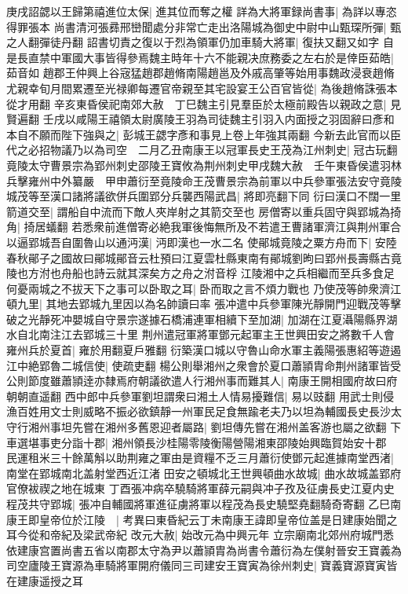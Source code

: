 庚戌詔勰以王歸第禧進位太保|{
	進其位而奪之權}
詳為大將軍録尚書事|{
	為詳以專恣得罪張本}
尚書清河張彞邢巒聞處分非常亡走出洛陽城為御史中尉中山甄琛所彈|{
	甄之人翻彈徒丹翻}
詔書切責之復以于烈為領軍仍加車騎大將軍|{
	復扶又翻又如字}
自是長直禁中軍國大事皆得參焉魏主時年十六不能親决庶務委之左右於是倖臣茹皓|{
	茹音如}
趙郡王仲興上谷宼猛趙郡趙脩南陽趙邕及外戚高肇等始用事魏政浸衰趙脩尤親幸旬月間累遷至光禄卿每遷官帝親至其宅設宴王公百官皆從|{
	為後趙脩誅張本從才用翻}
辛亥東昏侯祀南郊大赦　丁巳魏主引見羣臣於太極前殿告以親政之意|{
	見賢遍翻}
壬戌以咸陽王禧領太尉廣陵王羽為司徒魏主引羽入内面授之羽固辭曰彥和本自不願而陛下強與之|{
	彭城王勰字彥和事見上卷上年強其兩翻}
今新去此官而以臣代之必招物議乃以為司空　二月乙丑南康王以冠軍長史王茂為江州刺史|{
	冠古玩翻}
竟陵太守曹景宗為郢州刺史邵陵王寶攸為荆州刺史甲戌魏大赦　壬午東昏侯遣羽林兵擊雍州中外纂嚴　甲申蕭衍至竟陵命王茂曹景宗為前軍以中兵參軍張法安守竟陵城茂等至漢口諸將議欲併兵圍郢分兵襲西陽武昌|{
	將即亮翻下同}
衍曰漢口不闊一里箭道交至|{
	謂船自中流而下敵人夾岸射之其箭交至也}
房僧寄以重兵固守與郢城為掎角|{
	掎居蟻翻}
若悉衆前進僧寄必絶我軍後悔無所及不若遣王曹諸軍濟江與荆州軍合以逼郢城吾自圍魯山以通沔漢|{
	沔即漢也一水二名}
使鄖城竟陵之粟方舟而下|{
	安陸春秋鄖子之國故曰鄖城鄖音云杜預曰江夏雲杜縣東南有鄖城劉昫曰郢州長壽縣古竟陵也方泭也舟船也詩云就其深矣方之舟之泭音桴}
江陵湘中之兵相繼而至兵多食足何憂兩城之不拔天下之事可以卧取之耳|{
	卧而取之言不煩力戰也}
乃使茂等帥衆濟江頓九里|{
	其地去郢城九里因以為名帥讀曰率}
張冲遣中兵參軍陳光靜開門迎戰茂等擊破之光靜死冲嬰城自守景宗遂據石橋浦連軍相續下至加湖|{
	加湖在江夏灄陽縣界湖水自北南注江去郢城三十里}
荆州遣冠軍將軍鄧元起軍主王世興田安之將數千人會雍州兵於夏首|{
	雍於用翻夏戶雅翻}
衍築漢口城以守魯山命水軍主義陽張惠紹等遊遏江中絶郢魯二城信使|{
	使疏吏翻}
楊公則舉湘州之衆會於夏口蕭頴胄命荆州諸軍皆受公則節度雖蕭頴逹亦隸焉府朝議欲遣人行湘州事而難其人|{
	南康王開相國府故曰府朝朝直遥翻}
西中郎中兵參軍劉坦謂衆曰湘土人情易擾難信|{
	易以豉翻}
用武士則侵漁百姓用文士則威略不振必欲鎮靜一州軍民足食無踰老夫乃以坦為輔國長史長沙太守行湘州事坦先嘗在湘州多舊恩迎者屬路|{
	劉坦傳先嘗在湘州盖客游也屬之欲翻}
下車選堪事吏分詣十郡|{
	湘州領長沙桂陽零陵衡陽營陽湘東邵陵始興臨賀始安十郡}
民運租米三十餘萬斛以助荆雍之軍由是資糧不乏三月蕭衍使鄧元起進據南堂西渚|{
	南堂在郢城南北盖射堂西近江渚}
田安之頓城北王世興頓曲水故城|{
	曲水故城盖郢府官僚袚禊之地在城東}
丁酉張冲病卒驍騎將軍薛元嗣與冲子孜及征虜長史江夏内史程茂共守郢城|{
	張冲自輔國將軍進征虜將軍以程茂為長史驍堅堯翻騎奇寄翻}
乙巳南康王即皇帝位於江陵　|{
	考異曰東昏紀云丁未南康王諱即皇帝位盖是日建康始聞之耳今從和帝紀及梁武帝紀}
改元大赦|{
	始改元為中興元年}
立宗廟南北郊州府城門悉依建康宫置尚書五省以南郡太守為尹以蕭頴胄為尚書令蕭衍為左僕射晉安王寶義為司空廬陵王寶源為車騎將軍開府儀同三司建安王寶寅為徐州刺史|{
	寶義寶源寶寅皆在建康遥授之耳}

